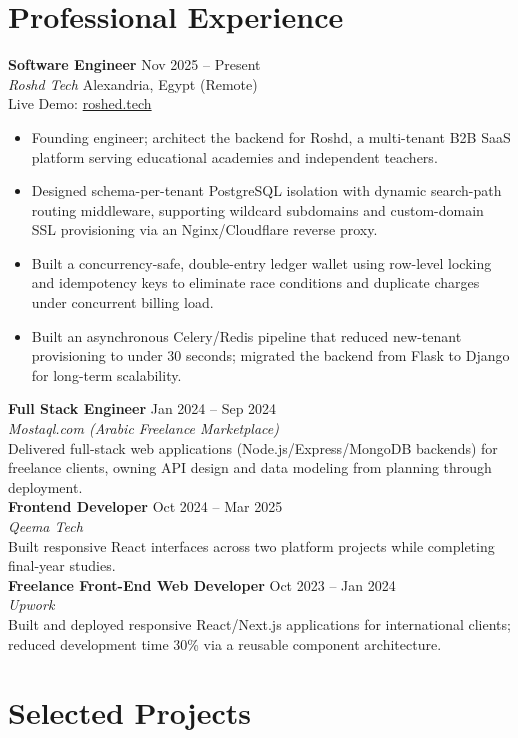 \documentclass[10pt,letterpaper]{article}
\newcommand{\sectionrule}{\vspace{-1pt}{\color{hairline}\hrule height 0.6pt}\vspace{2pt}}
\newcommand{\entryHeading}[4]{%
  \textbf{#1} \hfill {\small\color{muted}#2}\\
  {\small\color{muted}\textit{#3}} \hfill {\small\color{muted}#4}\\[0pt]
}
\newcommand{\linkLine}[3]{{\footnotesize\color{muted}#1: }{\footnotesize\href{#2}{#3}}\\[0pt]}
\newcommand{\shortEntry}[4]{%
  \textbf{#1} \hfill {\small\color{muted}#2}\\
  {\small\color{muted}\textit{#3}}\\
  {\small #4}\\[1pt]
}
\begin{document}
\section*{Professional Experience}
\sectionrule

\entryHeading{Software Engineer}{Nov 2025 -- Present}{Roshd Tech}{Alexandria, Egypt (Remote)}
\linkLine{Live Demo}{https://roshed.tech/}{roshed.tech}
{\small
\begin{itemize}
    \item Founding engineer; architect the backend for Roshd, a multi-tenant B2B SaaS platform serving
    educational academies and independent teachers.
    \item Designed schema-per-tenant PostgreSQL isolation with dynamic search-path routing middleware,
    supporting wildcard subdomains and custom-domain SSL provisioning via an Nginx/Cloudflare reverse proxy.
    \item Built a concurrency-safe, double-entry ledger wallet using row-level locking and idempotency keys
    to eliminate race conditions and duplicate charges under concurrent billing load.
    \item Built an asynchronous Celery/Redis pipeline that reduced new-tenant provisioning to under 30 seconds;
    migrated the backend from Flask to Django for long-term scalability.
\end{itemize}
}

\shortEntry{Full Stack Engineer}{Jan 2024 -- Sep 2024}{Mostaql.com (Arabic Freelance Marketplace)}{Delivered full-stack web applications (Node.js/Express/MongoDB backends) for freelance clients, owning API design and data modeling from planning through deployment.}

\shortEntry{Frontend Developer}{Oct 2024 -- Mar 2025}{Qeema Tech}{Built responsive React interfaces across two platform projects while completing final-year studies.}

\shortEntry{Freelance Front-End Web Developer}{Oct 2023 -- Jan 2024}{Upwork}{Built and deployed responsive React/Next.js applications for international clients; reduced development time 30\% via a reusable component architecture.}

\section*{Selected Projects}
\sectionrule
\end{document}
